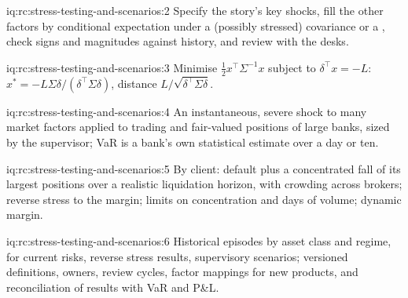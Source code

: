 \begin{solution}{iq:rc:stress-testing-and-scenarios:2}
Specify the story's key shocks, fill the other factors by conditional expectation under a
(possibly stressed) covariance or a , check signs and magnitudes against history,
and review with the desks.
\end{solution}

\begin{solution}{iq:rc:stress-testing-and-scenarios:3}
Minimise $\tfrac12x^\top\Sigma^{-1}x$ subject to $\delta^\top x = -L$: $x^* = -L\Sigma\delta/(\delta^\top\Sigma\delta)$, distance $L/\sqrt{\delta^\top\Sigma\delta}$.
\end{solution}

\begin{solution}{iq:rc:stress-testing-and-scenarios:4}
An instantaneous, severe shock to many market factors applied to trading and fair-valued
positions of large banks, sized by the supervisor; VaR is a bank's own statistical estimate over a
day or ten.
\end{solution}

\begin{solution}{iq:rc:stress-testing-and-scenarios:5}
By client: default plus a concentrated fall of its largest positions over a realistic liquidation
horizon, with crowding across brokers; reverse stress to the margin; limits on concentration and
days of volume; dynamic margin.
\end{solution}

\begin{solution}{iq:rc:stress-testing-and-scenarios:6}
Historical episodes by asset class and regime,  for current risks, reverse
stress results, supervisory scenarios; versioned definitions, owners, review cycles, factor
mappings for new products, and reconciliation of results with VaR and P\&L.
\end{solution}
